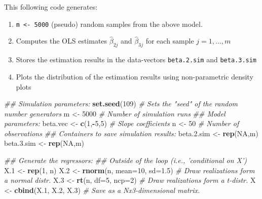 \documentclass[]{book}
\newenvironment{Shaded}{\begin{snugshade}}{\end{snugshade}}
\newcommand{\CommentTok}[1]{\textcolor[rgb]{0.56,0.35,0.01}{\textit{#1}}}
\newcommand{\DataTypeTok}[1]{\textcolor[rgb]{0.13,0.29,0.53}{#1}}
\newcommand{\DecValTok}[1]{\textcolor[rgb]{0.00,0.00,0.81}{#1}}
\newcommand{\FloatTok}[1]{\textcolor[rgb]{0.00,0.00,0.81}{#1}}
\newcommand{\KeywordTok}[1]{\textcolor[rgb]{0.13,0.29,0.53}{\textbf{#1}}}
\newcommand{\NormalTok}[1]{#1}
\newcommand{\OperatorTok}[1]{\textcolor[rgb]{0.81,0.36,0.00}{\textbf{#1}}}
\newcommand{\OtherTok}[1]{\textcolor[rgb]{0.56,0.35,0.01}{#1}}
\newcommand{\StringTok}[1]{\textcolor[rgb]{0.31,0.60,0.02}{#1}}
\providecommand{\tightlist}{%
  \setlength{\itemsep}{0pt}\setlength{\parskip}{0pt}}
\theoremstyle{definition}
\theoremstyle{definition}
\theoremstyle{definition}
\theoremstyle{remark}
\begin{document}
This following code generates:

\begin{enumerate}
\def\labelenumi{\arabic{enumi}.}
\tightlist
\item
  \texttt{m\ \textless{}-\ 5000} (pseudo) random samples from the above model.
\item
  Computes the OLS estimates \(\hat{\beta}_{2j}\) and \(\hat{\beta}_{3j}\) for each sample \(j=1,\dots,m\)
\item
  Stores the estimation results in the data-vectors \texttt{beta.2.sim} and \texttt{beta.3.sim}
\item
  Plots the distribution of the estimation results using non-parametric density plots
\end{enumerate}

\begin{Shaded}
\begin{Highlighting}[]
\CommentTok{## Simulation parameters:}
\KeywordTok{set.seed}\NormalTok{(}\DecValTok{109}\NormalTok{)            }\CommentTok{# Sets the "seed" of the random number generators}
\NormalTok{m           <-}\StringTok{ }\DecValTok{5000}      \CommentTok{# Number of simulation runs}
\CommentTok{## Model parameters:}
\NormalTok{beta.vec    <-}\StringTok{ }\KeywordTok{c}\NormalTok{(}\DecValTok{1}\NormalTok{,}\OperatorTok{-}\DecValTok{5}\NormalTok{,}\DecValTok{5}\NormalTok{) }\CommentTok{# Slope coefficients}
\NormalTok{n           <-}\StringTok{ }\DecValTok{50}        \CommentTok{# Number of observations}
\CommentTok{## Containers to save simulation results:}
\NormalTok{beta.}\FloatTok{2.}\NormalTok{sim  <-}\StringTok{ }\KeywordTok{rep}\NormalTok{(}\OtherTok{NA}\NormalTok{,m) }
\NormalTok{beta.}\FloatTok{3.}\NormalTok{sim  <-}\StringTok{ }\KeywordTok{rep}\NormalTok{(}\OtherTok{NA}\NormalTok{,m) }

\CommentTok{## Generate the regressors: }
\CommentTok{## Outside of the loop (i.e., 'conditional on X')}
\NormalTok{X}\FloatTok{.1}\NormalTok{ <-}\StringTok{ }\KeywordTok{rep}\NormalTok{(}\DecValTok{1}\NormalTok{, n)}
\NormalTok{X}\FloatTok{.2}\NormalTok{ <-}\StringTok{ }\KeywordTok{rnorm}\NormalTok{(n, }\DataTypeTok{mean=}\DecValTok{10}\NormalTok{, }\DataTypeTok{sd=}\FloatTok{1.5}\NormalTok{)    }\CommentTok{# Draw realizations form a normal distr.}
\NormalTok{X}\FloatTok{.3}\NormalTok{ <-}\StringTok{ }\KeywordTok{rt}\NormalTok{(n, }\DataTypeTok{df=}\DecValTok{5}\NormalTok{, }\DataTypeTok{ncp=}\DecValTok{2}\NormalTok{)           }\CommentTok{# Draw realizations form a t-distr.}
\NormalTok{X   <-}\StringTok{ }\KeywordTok{cbind}\NormalTok{(X}\FloatTok{.1}\NormalTok{, X}\FloatTok{.2}\NormalTok{, X}\FloatTok{.3}\NormalTok{)         }\CommentTok{# Save as a Nx3-dimensional matrix.}


\end{Highlighting}
\end{Shaded}
\end{document}
